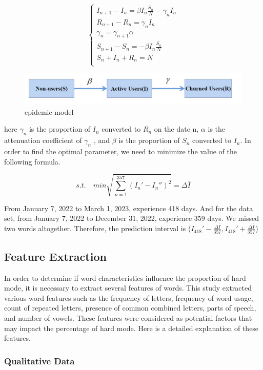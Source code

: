 \documentclass[
  journal=medium,
  manuscript=Report,
  year=2023,
  volume=37,
]{cup-journal}
\begin{document}
\[
\begin{cases}
    I_{n+1} - I_{n} = \beta I_n \frac{S_n}{N}-\gamma_n I_n \\
    R_{n+1} - R_{n} = \gamma_n I_n  \\
    \gamma_n = \gamma_{n+1}\alpha  \\
    S_{n+1}-S_{n} = -\beta I_n \frac{S_n}{N}\\
    S_n + I_n + R_n = N \\
\end{cases}
\]

\begin{figure}[hbt!]
    \centering
    \includegraphics[width=0.7\linewidth]{pic/SIR.png}
    \caption{epidemic model}
    \label{SIR}
\end{figure}

here $\gamma_n$ is the proportion of $I_n$ converted to $R_n$ on the date n, $\alpha$ is the attenuation coefficient of $\gamma_n$ , and $\beta$ is the proportion of $S_n$ converted to $I_n$. In order to find the optimal parameter, we need to minimize the value of the following formula.

$$s.t. \quad min \sqrt{\sum_{n=1}^{357}(I_n'-I_n'')^2} = \Delta \overline{I}$$

From January 7, 2022 to March 1, 2023, experience 418 days. And for the data set, from January 7, 2022 to December 31, 2022, experience 359 days. We missed two words altogether. Therefore, the prediction interval is ($I_{418}' - \frac{\Delta \overline{I}}{357},I_{418}' + \frac{\Delta \overline{I}}{357}$)

\subsection{Feature Extraction}

In order to determine if word characteristics influence the proportion of hard mode, it is necessary to extract several features of words. This study extracted various word features such as the frequency of letters, frequency of word usage, count of repeated letters, presence of common combined letters, parts of speech, and number of vowels. These features were considered as potential factors that may impact the percentage of hard mode. Here is a detailed explanation of these features. 

\subsubsection{Qualitative Data}
\end{document}
